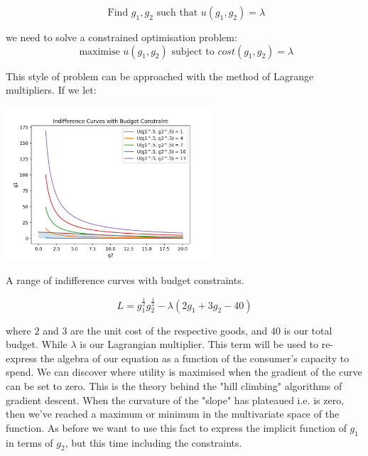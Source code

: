 \documentclass{tufte-handout}
\begin{document}
$$ \text{ Find } g_{1}, g_{2} \text{ such that } u(g_{1}, g_{2}) = \lambda $$

\noindent we need to solve a constrained optimisation problem: 
$$ \text{ maximise } u(g_{1}, g_{2})  \text{ subject to } cost(g_{1}, g_{2}) =  \lambda$$

\noindent This style of problem can be approached with the method of Lagrange multipliers. If we let:

\begin{marginfigure}
\includegraphics[width=3in, height=5.in]{Plots/indifference_curves_budget.png}
\caption{A range of indifference curves with budget constraints.}
\end{marginfigure}

$$ L = g_{1}^{\frac{1}{2}}g_{2}^{\frac{1}{2}} - \lambda(2g_{1} + 3g_{2} - 40) $$

\noindent where $2$ and $3$ are the unit cost of the respective goods, and $40$ is our total budget. While $\lambda$ is our Lagrangian multiplier. This term will be used to re-express the algebra of our equation as a function of the consumer's capacity to spend. We can discover where utility is maximised when the gradient of the curve can be set to zero. This is the theory behind the "hill climbing" algorithms of gradient descent. When the curvature of the "slope" has plateaued i.e. is zero, then we've reached a maximum or minimum in the multivariate space of the function. As before we want to use this fact to express the implicit function of $g_{1}$ in terms of $g_{2}$, but this time including the constraints.
\end{document}
